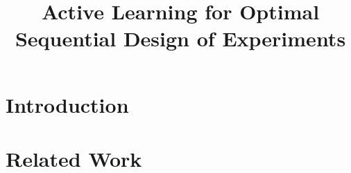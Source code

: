 \documentclass[conference]{IEEEtran}
\begin{document}
	
	
	\title{\LARGE \textbf{Active Learning for Optimal Sequential Design of Experiments}
	}
	
	
	\author{
		} %
	
	
	\maketitle
	
	\begin{abstract}
	\end{abstract}
	
	
	\section{Introduction}
	\label{sec:introduction}
	
	
	
	
	
	
	
	
	\section{Related Work}
	\label{sec:related-work}
	
\end{document}
